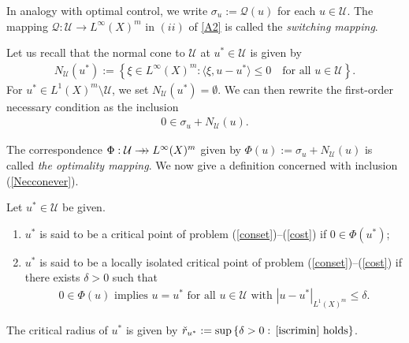 \documentclass[hidelinks,onefignum,onetabnum]{siamart220329}
\newcommand{\rrightarrow}{\mathrel{\mathrlap{\rightarrow}\mkern1mu\rightarrow}}
\let\twoheadrightarrow\rrightarrow
\begin{document}
In analogy with optimal control,  we write $\sigma_{u}:=\mathcal Q(u)$ for each  $u\in\mathcal U$. The mapping $\mathcal Q:\mathcal U\to L^\infty(X)^m$ in $(ii)$ of \cref{A2} is called the \textit{switching mapping}.

Let us recall that the normal cone to $\mathcal U$ at $u^* \in \mathcal U$ is given by 
\begin{align*}
	N_{\mathcal U}(u^*):=\left\lbrace \xi\in L^\infty(X)^m:\langle \xi,u-u^*\rangle\le0\quad\text{for all $u\in  \mathcal U$}\right\rbrace.
\end{align*}
 For $u^* \in L^1(X)^m \setminus \mathcal U$, we set $N_{\mathcal U}(u^*) = \emptyset$.
We can then rewrite the first-order necessary condition as the inclusion
\begin{align}\label{Necconever}
	0\in \sigma_{u}+N_{\mathcal U}(u).
\end{align}

The correspondence $\Phi:\mathcal U\twoheadrightarrow L^\infty(X)^m$  given by $\Phi(u):=\sigma_u+N_{\mathcal U}(u)$ is called \textit{the optimality mapping}.
We now give a definition concerned with inclusion (\ref{Necconever}).

\begin{definition}
	Let $u^* \in \mathcal U$ be given.
	\begin{enumerate}
		\item $u^*$ is said to be a critical point of problem (\ref{conset})--(\ref{cost}) if $0\in\Phi(u^*)$;
		
		\item  $u^*$ is said to be  a locally isolated critical point of problem (\ref{conset})--(\ref{cost}) if there exists $\delta>0$ such that 
		\begin{align}\label{iscrimin}
			\text{$0\in\Phi(u)$ implies $u=u^*$ for all $u\in\mathcal U$ with $|u-u^*|_{L^1(X)^m}\le\delta$}.
		\end{align}
	\end{enumerate}
The critical radius of $u^*$ is given by $	\check r_{u^*}:=\sup\left\lbrace \delta>0: \,\text{\cref{iscrimin} holds}\right\rbrace$.
\end{definition}
\end{document}
